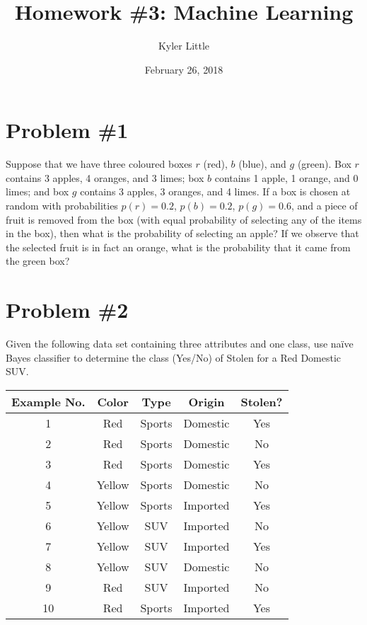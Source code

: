 \documentclass[12pt]{article}
\author{Kyler Little\vspace{-0.6cm}}
\title{Homework \#3: Machine Learning\vspace{-0.3cm}}
\date{February 26, 2018\vspace{-0.7cm}}
\begin{document}
	\maketitle
	\section*{Problem \#1}
	Suppose that we have three coloured boxes $r$ (red), $b$ (blue), and $g$ (green). Box $r$ contains 3 apples, 4 oranges, and 3 limes; box $b$ contains 1 apple, 1 orange, and 0 limes; and box $g$ contains 3 apples, 3 oranges, and 4 limes. If a box is chosen at random with probabilities $p(r) = 0.2$, $p(b) = 0.2$, $p(g) = 0.6$, and a piece of fruit is removed from the box (with equal probability of selecting any of the items in the box), then what is the probability of selecting an apple? If we observe that the selected fruit is in fact an orange, what is the probability that it came from the green box?
	
	 
	\section*{Problem \#2}
	Given the following data set containing three attributes and one class, use naïve Bayes classifier to determine the class (Yes/No) of Stolen for a Red Domestic SUV.
	\begin{center}
		\begin{tabular*}{280pt}[t]{c |c c c | c}
			Example No. & Color & Type & Origin & Stolen? \\
			\hline \hline
			1 & Red & Sports & Domestic & Yes \\
			2 & Red & Sports & Domestic & No \\
			3 & Red & Sports & Domestic & Yes \\
			4 & Yellow & Sports & Domestic & No \\
			5 & Yellow & Sports & Imported & Yes \\
			6 & Yellow & SUV & Imported & No \\
			7 & Yellow & SUV & Imported & Yes \\
			8 & Yellow & SUV & Domestic & No \\
			9 & Red & SUV & Imported & No \\
			10 & Red & Sports & Imported & Yes \\
		\end{tabular*}
	\end{center}

	
\end{document}
